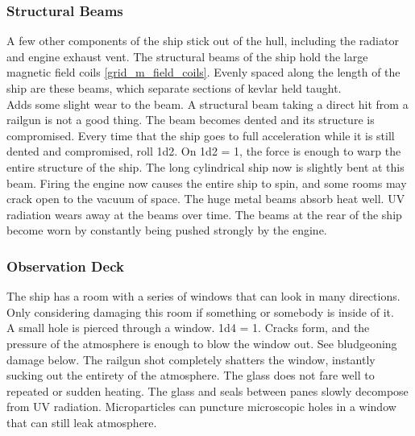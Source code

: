 \documentclass[a4paper]{article}
\begin{document}
\vspace{-0.5cm} \hspace{-18pt} \subsubsection{Structural Beams} \label{outer_beams} \vspace{-0.2cm}
A few other components of the ship stick out of the hull, including the radiator and engine exhaust vent. The structural beams of the ship hold the large magnetic field coils \ref{grid_m_field_coils}. Evenly spaced along the length of the ship are these beams, which separate sections of kevlar held taught. 
\\ \pbhw
{Adds some slight wear to the beam.}
{A structural beam taking a direct hit from a railgun is not a good thing. The beam becomes dented and its structure is compromised. Every time that the ship goes to full acceleration while it is still dented and compromised, roll 1d2. On 1d2 = 1, the force is enough to warp the entire structure of the ship. The long cylindrical ship now is slightly bent at this beam. Firing the engine now causes the entire ship to spin, and some rooms may crack open to the vacuum of space.}
{The huge metal beams absorb heat well.}
{UV radiation wears away at the beams over time. The beams at the rear of the ship become worn by constantly being pushed strongly by the engine. }


\vspace{-0.5cm} \hspace{-18pt} \subsubsection{Observation Deck} \label{outer_observation} \vspace{-0.2cm}
The ship has a room with a series of windows that can look in many directions. Only considering damaging this room if something or somebody is inside of it.
\\ \pbhw
{A small hole is pierced through a window. \newline 1d4 = 1. Cracks form, and the pressure of the atmosphere is enough to blow the window out. See bludgeoning damage below.}
{The railgun shot completely shatters the window, instantly sucking out the entirety of the atmosphere.}
{The glass does not fare well to repeated or sudden heating.}
{The glass and seals between panes slowly decompose from UV radiation. Microparticles can puncture microscopic holes in a window that can still leak atmosphere.}
\end{document}
